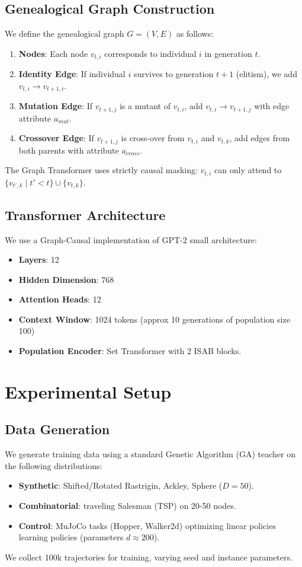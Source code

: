 \documentclass{article}
\begin{document}
\subsection{Genealogical Graph Construction}
We define the genealogical graph $G=(V, E)$ as follows:
\begin{enumerate}
    \item \textbf{Nodes}: Each node $v_{t,i}$ corresponds to individual $i$ in generation $t$.
    \item \textbf{Identity Edge}: If individual $i$ survives to generation $t+1$ (elitism), we add $v_{t,i} \to v_{t+1,i}$.
    \item \textbf{Mutation Edge}: If $v_{t+1,j}$ is a mutant of $v_{t,i}$, add $v_{t,i} \to v_{t+1,j}$ with edge attribute $a_{mut}$.
    \item \textbf{Crossover Edge}: If $v_{t+1,j}$ is cross-over from $v_{t,i}$ and $v_{t,k}$, add edges from both parents with attribute $a_{cross}$.
\end{enumerate}
The Graph Transformer uses strictly causal masking: $v_{t,i}$ can only attend to $\{v_{t', k} \mid t' < t\} \cup \{v_{t, k}\}$.

\subsection{Transformer Architecture}
We use a Graph-Causal implementation of GPT-2 small architecture:
\begin{itemize}
    \item \textbf{Layers}: 12
    \item \textbf{Hidden Dimension}: 768
    \item \textbf{Attention Heads}: 12
    \item \textbf{Context Window}: 1024 tokens (approx 10 generations of population size 100)
    \item \textbf{Population Encoder}: Set Transformer with 2 ISAB blocks.
\end{itemize}

\section{Experimental Setup}

\subsection{Data Generation}
We generate training data using a standard Genetic Algorithm (GA) teacher on the following distributions:
\begin{itemize}
    \item \textbf{Synthetic}: Shifted/Rotated Rastrigin, Ackley, Sphere ($D=50$).
    \item \textbf{Combinatorial}: traveling Salesman (TSP) on 20-50 nodes.
    \item \textbf{Control}: MuJoCo tasks (Hopper, Walker2d) optimizing linear policies learning policies (parameters $d \approx 200$).
\end{itemize}
We collect 100k trajectories for training, varying seed and instance parameters.
\end{document}
